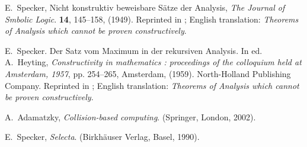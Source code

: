 \documentclass{ws-rv9x6}
\begin{document}
\begin{thebibliography}{25}
E.~Specker, Nicht konstruktiv beweisbare {S}\"atze der {A}nalysis, \emph{The
  Journal of Smbolic Logic}. {\bf 14},  145--158,  (1949).
\newblock Reprinted in \cite[pp. 35--48]{specker-ges}; {E}nglish translation:
  {\it Theorems of Analysis which cannot be proven constructively}.

E.~Specker.
\newblock Der {S}atz vom {M}aximum in der rekursiven {A}nalysis.
\newblock In ed. A.~Heyting, \emph{Constructivity in mathematics : proceedings
  of the colloquium held at Amsterdam, 1957}, pp. 254--265, Amsterdam,  (1959).
  North-Holland Publishing Company.
\newblock Reprinted in \cite[pp. 148--159]{specker-ges}; {E}nglish translation:
  {\it Theorems of Analysis which cannot be proven constructively}.

A.~Adamatzky, \emph{Collision-based computing}. (Springer, London, 2002).

E.~Specker, \emph{Selecta}. (Birkh{\"{a}}user Verlag, Basel, 1990).

\end{thebibliography}
\end{document}
